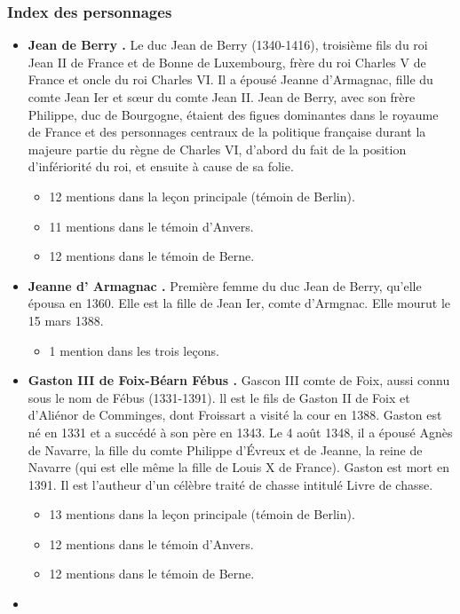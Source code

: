\documentclass[12pt, a4paper]{article}
\begin{document}
        \subsubsection{Index des personnages}
        \begin{itemize} \item{\textbf{
              Jean
              de
              Berry
            .} Le duc Jean de Berry (1340-1416), troisième fils du roi Jean II de France et de Bonne de Luxembourg, frère du roi Charles V de France et
              oncle du roi Charles VI. Il a épousé Jeanne d'Armagnac, fille du comte Jean Ier et sœur du comte Jean II. Jean de Berry, avec son frère
              Philippe, duc de Bourgogne, étaient des figues dominantes dans le royaume de France et des personnages centraux de la politique française
              durant la majeure partie du règne de Charles VI, d'abord du fait de la position d'infériorité du roi, et ensuite à cause de sa folie. \begin{itemize} \item{12 mentions dans la leçon principale (témoin de Berlin).}  \item{11 mentions dans le témoin d'Anvers.}  \item{12 mentions dans le témoin de Berne.}  \end{itemize}}  \item{\textbf{
              Jeanne
              d'
              Armagnac
            .} Première femme du duc Jean de Berry, qu'elle épousa en 1360. Elle est la fille de Jean Ier, comte d'Armgnac.
              Elle mourut le 15 mars 1388. \begin{itemize} \item{1 mention dans les trois leçons.}  \end{itemize}}  \item{\textbf{
              Gaston
              III
              de
              Foix-Béarn
              Fébus
            .} Gascon III comte de Foix, aussi connu sous le nom de Fébus (1331-1391). ll est le fils de Gaston II de Foix et
              d'Aliénor de Comminges, dont Froissart a visité la cour en 1388. Gaston est né en 1331 et a succédé à son père en 1343. Le 4 août 1348, il
              a épousé Agnès de Navarre, la fille du comte Philippe d'Évreux et de Jeanne, la reine de Navarre (qui est
              elle même la fille de Louis X de France). Gaston est mort en 1391. Il est l'autheur d'un célèbre traité de chasse intitulé Livre de chasse. \begin{itemize} \item{13 mentions dans la leçon principale (témoin de Berlin).}  \item{12 mentions dans le témoin d'Anvers.}  \item{12 mentions dans le témoin de Berne.}  \end{itemize}}  \item{\textbf{
}}
\end{itemize}
\end{document}
